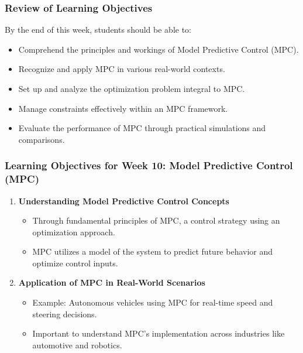 \documentclass[aspectratio=169]{beamer}
\begin{document}
\begin{frame}[fragile]
    \frametitle{Review of Learning Objectives}
    By the end of this week, students should be able to:
    \begin{itemize}
        \item Comprehend the principles and workings of Model Predictive Control (MPC).
        \item Recognize and apply MPC in various real-world contexts.
        \item Set up and analyze the optimization problem integral to MPC.
        \item Manage constraints effectively within an MPC framework.
        \item Evaluate the performance of MPC through practical simulations and comparisons.
    \end{itemize}
\end{frame}

\begin{frame}[fragile]
    \frametitle{Learning Objectives for Week 10: Model Predictive Control (MPC)}
    \begin{enumerate}
        \item \textbf{Understanding Model Predictive Control Concepts}
        \begin{itemize}
            \item Through fundamental principles of MPC, a control strategy using an optimization approach.
            \item MPC utilizes a model of the system to predict future behavior and optimize control inputs.
        \end{itemize}
        
        \item \textbf{Application of MPC in Real-World Scenarios}
        \begin{itemize}
            \item Example: Autonomous vehicles using MPC for real-time speed and steering decisions.
            \item Important to understand MPC's implementation across industries like automotive and robotics.
        \end{itemize}
    \end{enumerate}
\end{frame}
\end{document}
